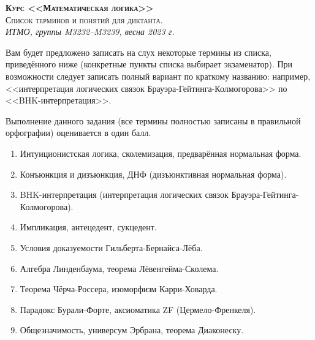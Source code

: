 \documentclass[11pt,a4paper,oneside]{scrartcl}
\begin{document}
\pagestyle{empty}

\begin{center}
{\large\scshape\bfseries Курс <<Математическая логика>>}\\
{\large\scshape Список терминов и понятий для диктанта.}\\
\itshape ИТМО, группы M3232--M3239, весна 2023 г.
\end{center}


Вам будет предложено записать на слух некоторые термины из списка, приведённого ниже 
(конкретные пункты списка выбирает экзаменатор). При возможности следует записать полный вариант 
по краткому названию: например, <<интерпретация логических связок Брауэра-Гейтинга-Колмогорова>> 
по <<BHK-интерпретация>>.

Выполнение данного задания (все термины полностью записаны в правильной орфографии) 
оценивается в один балл.

\begin{enumerate}
\item Интуиционистская логика, сколемизация, предварённая нормальная форма.
\item Конъюнкция и дизъюнкция, ДНФ (дизъюнктивная нормальная форма).
\item BHK-интерпретация (интерпретация логических связок Брауэра-Гейтинга-Колмогорова).
\item Импликация, антецедент, сукцедент.
\item Условия доказуемости Гильберта-Бернайса-Лёба.
\item Алгебра Линденбаума, теорема Лёвенгейма-Сколема.
\item Теорема Чёрча-Россера, изоморфизм Карри-Ховарда.
\item Парадокс Бурали-Форте, аксиоматика ZF (Цермело-Френкеля).
\item Общезначимость, универсум Эрбрана, теорема Диаконеску.
\end{enumerate}
\end{document}
